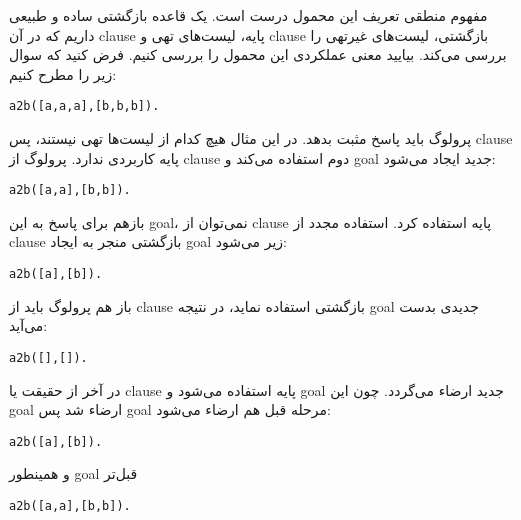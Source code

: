 مفهوم منطقی تعریف این محمول درست است. یک قاعده بازگشتی ساده و طبیعی داریم که در آن clause پایه، لیست‌های تهی و clause بازگشتی، لیست‌های غیرتهی را بررسی می‌کند. بیایید معنی عملکردی این محمول را بررسی کنیم. فرض کنید که سوال زیر را مطرح کنیم:

\begin{latin}
\begin{lstlisting}
a2b([a,a,a],[b,b,b]).
\end{lstlisting}
\end{latin}

پرولوگ باید پاسخ مثبت بدهد. در این مثال هیچ کدام از لیست‌ها تهی نیستند، پس clause پایه کاربردی ندارد. پرولوگ از clause دوم استفاده می‌کند و goal جدید ایجاد می‌شود:

\begin{latin}
\begin{lstlisting}
a2b([a,a],[b,b]).
\end{lstlisting}
\end{latin}

بازهم برای پاسخ به این goal، نمی‌توان از clause پایه استفاده کرد. استفاده مجدد از clause بازگشتی منجر به ایجاد goal زیر می‌شود:

\begin{latin}
\begin{lstlisting}
a2b([a],[b]).
\end{lstlisting}
\end{latin}

باز هم پرولوگ باید از clause بازگشتی استفاده نماید، در نتیجه goal جدیدی بدست می‌آید:

\begin{latin}
\begin{lstlisting}
a2b([],[]).
\end{lstlisting}
\end{latin}

در آخر از حقیقت یا clause پایه استفاده می‌شود و goal جدید ارضاء می‌گردد.  چون این goal ارضاء شد پس goal مرحله قبل هم ارضاء می‌شود:


\begin{latin}
\begin{lstlisting}
a2b([a],[b]).
\end{lstlisting}
\end{latin}

و همینطور goal قبل‌تر

\begin{latin}
\begin{lstlisting}
a2b([a,a],[b,b]).
\end{lstlisting}
\end{latin}

